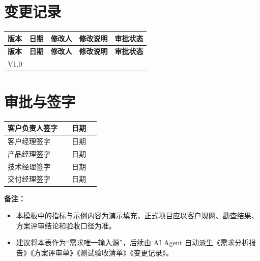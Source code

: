 \documentclass[12pt,a4paper]{ctexart}
\begin{document}
\section{变更记录}

\begin{longtable}{|>{\centering\arraybackslash}p{1.4cm}|
                  >{\centering\arraybackslash}p{2.1cm}|
                  >{\centering\arraybackslash}p{1.8cm}|
                  >{\raggedright\arraybackslash}p{6.0cm}|
                  >{\centering\arraybackslash}p{1.8cm}|}
\hline
\textbf{版本} & \textbf{日期} & \textbf{修改人} & \textbf{修改说明} & \textbf{审批状态} \\
\hline
\endfirsthead

\hline
\textbf{版本} & \textbf{日期} & \textbf{修改人} & \textbf{修改说明} & \textbf{审批状态} \\
\hline
\endhead

\hline
\endfoot

\hline
\endlastfoot

V1.0 & %
\end{longtable}

\section{审批与签字}

\begin{tabularx}{\textwidth}{|P{3.2cm}|Y|P{3.2cm}|Y|}
\hline
客户负责人签字 & \vspace{1.2cm} & 日期 & \\
\hline
客户经理签字 & \vspace{1.2cm} & 日期 & \\
\hline
产品经理签字 & \vspace{1.2cm} & 日期 & \\
\hline
技术经理签字 & \vspace{1.2cm} & 日期 & \\
\hline
交付经理签字 & \vspace{1.2cm} & 日期 & \\
\hline
\end{tabularx}

\vspace{1em}
\textbf{备注：}
\begin{itemize}[leftmargin=2em]
    \item 本模板中的指标与示例内容为演示填充，正式项目应以客户现网、勘查结果、方案评审结论和验收口径为准。
    \item 建议将本表作为“需求唯一输入源”，后续由 AI Agent 自动派生《需求分析报告》《方案评审单》《测试验收清单》《变更记录》。
\end{itemize}
\end{document}

